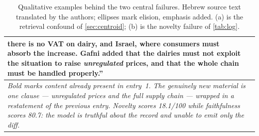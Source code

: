 \documentclass[11pt]{article}
\begin{document}
\begin{table}[t]
\begin{tabular}{p{}p{}}
\textbf{there is no VAT on dairy}, and Israel, where \textbf{consumers must absorb the
increase}. Gafni added that the dairies must not exploit the situation to raise
\emph{unregulated} prices, and that the whole chain must be handled properly.'' \\
\hline
\multicolumn{2}{p{0.94\textwidth}}{\emph{Bold marks content already present in entry~1. The
genuinely new material is one clause --- unregulated prices and the full supply chain ---
wrapped in a restatement of the previous entry. Novelty scores 18.1/100 while faithfulness
scores 80.7: the model is truthful about the record and unable to emit only the diff.}}\\
\hline
\end{tabular}
\caption{Qualitative examples behind the two central failures. Hebrew source text
translated by the authors; ellipses mark elision, emphasis added. (a) is the retrieval
confound of \cref{sec:centroid}; (b) is the novelty failure of \cref{tab:log}.}
\label{tab:examples}
\end{table}

\clearpage




\end{document}
